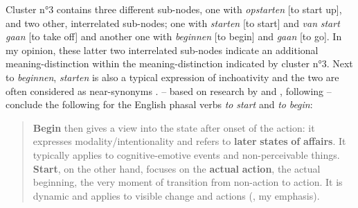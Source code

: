 Cluster n°3 contains three different sub-nodes, one with \textit{opstarten} [to start up], and two other, interrelated sub-nodes; one with \textit{starten} [to start] and \textit{van} \textit{start} \textit{gaan} [to take off] and another one with \textit{beginnen} [to begin] and \textit{gaan} [to go]. In my opinion, these latter two interrelated sub-nodes indicate an additional meaning-distinction within the meaning-distinction indicated by cluster n°3. Next to \textit{beginnen}, \textit{starten} is also a typical expression of inchoativity and the two are often considered as near-synonyms \citep[223]{schmid_introspection_1996}. \citet{lewandowska-tomasczyk_corpus-based_2009} – based on research by \citet{biber_longman_1999} and \citet{schmid_cottage_1993}, following \citet{quirk_comprehensive_1985} – conclude the following for the English phasal verbs \textit{to} \textit{start} and \textit{to} \textit{begin}:

\begin{quote}
\textbf{Begin} then gives a view into the state after onset of the action: it expresses modality/intentionality and refers to \textbf{later} \textbf{states} \textbf{of} \textbf{affairs}. It typically applies to cognitive-emotive events and non-perceivable things. \textbf{Start}, on the other hand, focuses on the \textbf{actual} \textbf{action}, the actual beginning, the very moment of transition from non-action to action. It is dynamic and applies to visible change and actions (\citealt[279]{lewandowska-tomasczyk_corpus-based_2009}, my emphasis).
\end{quote}

